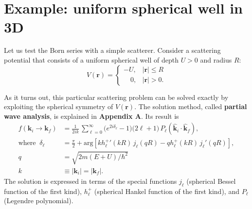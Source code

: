 \documentclass[prx,12pt]{revtex4-2}
\begin{document}
\section{Example: uniform spherical well in 3D}

Let us test the Born series with a simple scatterer.  Consider a
scattering potential that consists of a uniform spherical well of
depth $U > 0$ and radius $R$:
\begin{equation}
  V(\mathbf{r}) = \begin{cases}-U, & |\mathbf{r}| \le R \\ \;\;\;\,0,
    & |\mathbf{r}| > 0. \end{cases}
\end{equation}

As it turns out, this particular scattering problem can be solved
exactly by exploiting the spherical symmetry of $V(\mathbf{r})$.  The
solution method, called \textbf{partial wave analysis}, is explained
in \textbf{Appendix A}.  Its result is
\begin{equation}
  \begin{aligned}f(\mathbf{k}_i \rightarrow \mathbf{k}_f) &= \frac{1}{2ik}\, \sum_{\ell =0}^\infty \big(e^{2i\delta_\ell} - 1\big) \big(2\ell+1\big)\, P_{\ell}(\hat{\mathbf{k}}_i\cdot \hat{\mathbf{k}}_f), \\ \mathrm{where}\;\; \delta_\ell &= \frac{\pi}{2} + \mathrm{arg}\!\left[k {h_\ell^+}'(kR) \, j_\ell(qR) - qh_\ell^+(kR)\, j_\ell'(qR)\right], \\ q &= \sqrt{2m(E+U)/\hbar^2} \\ k &\equiv |\mathbf{k}_i| = |\mathbf{k}_f|.\end{aligned}
  \label{fresult_well}
\end{equation}
The solution is expressed in terms of the special functions $j_\ell$
(spherical Bessel function of the first kind), $h_\ell^+$ (spherical
Hankel function of the first kind), and $P_\ell$ (Legendre
polynomial).
\end{document}
